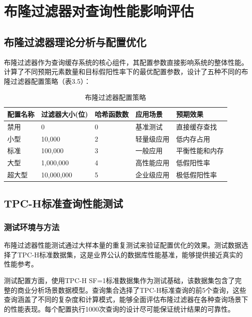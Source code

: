 \section{布隆过滤器对查询性能影响评估}

\subsection{布隆过滤器理论分析与配置优化}

布隆过滤器作为查询缓存系统的核心组件，其配置参数直接影响系统的整体性能。计算了不同预期元素数量和目标假阳性率下的最优配置参数，设计了五种不同的布隆过滤器配置策略（表3.5）：

\begin{table}[!htb]
    \caption{布隆过滤器配置策略}
    \label{table3_5}
    \centering
    \begin{tabular}{p{2.5cm}p{2.5cm}p{2.5cm}p{2.5cm}p{3cm}}
        \hline
        配置名称 & 过滤器大小(位) & 哈希函数数 & 应用场景 & 预期效果 \\
        \hline
        禁用 & 0 & 0 & 基准测试 & 直接缓存查找 \\
        小型 & 10,000 & 2 & 轻量级应用 & 低内存占用 \\
        标准 & 100,000 & 3 & 一般应用 & 平衡性能和内存 \\
        大型 & 1,000,000 & 4 & 高性能应用 & 低假阳性率 \\
        超大型 & 10,000,000 & 5 & 企业级应用 & 极低假阳性率 \\
        \hline
    \end{tabular}
\end{table}

\subsection{TPC-H标准查询性能测试}

\subsubsection{测试环境与方法}

布隆过滤器性能测试通过大样本量的重复测试来验证配置优化的效果。测试数据选择了TPC-H标准数据集，这是业界公认的数据库性能基准，能够提供接近真实的性能参考。

测试配置方面，使用TPC-H SF=1标准数据集作为测试基础，该数据集包含了完整的商业分析场景数据模型。查询集合选择了TPC-H标准查询的前5个查询，这些查询涵盖了不同的复杂度和计算模式，能够全面评估布隆过滤器在各种查询场景下的性能表现。每个配置执行1000次查询的设计尽可能保证统计结果的可靠性。
